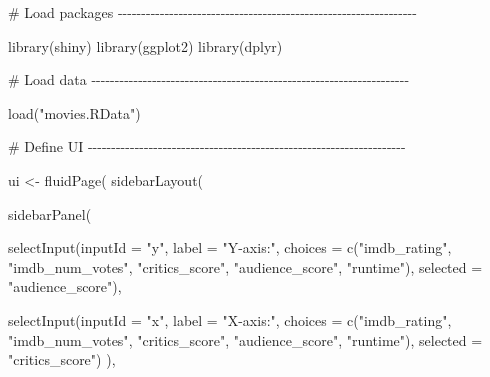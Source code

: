 \documentclass[
  letterpaper,
  DIV=11,
  numbers=noendperiod]{scrreprt}
\newenvironment{Shaded}{\begin{snugshade}}{\end{snugshade}}
\newcommand{\AttributeTok}[1]{\textcolor[rgb]{0.40,0.46,0.14}{#1}}
\newcommand{\CommentTok}[1]{\textcolor[rgb]{0.37,0.37,0.37}{#1}}
\newcommand{\FunctionTok}[1]{\textcolor[rgb]{0.28,0.35,0.67}{#1}}
\newcommand{\NormalTok}[1]{\textcolor[rgb]{0.00,0.46,0.62}{#1}}
\newcommand{\OtherTok}[1]{\textcolor[rgb]{0.00,0.46,0.62}{#1}}
\newcommand{\StringTok}[1]{\textcolor[rgb]{0.13,0.47,0.30}{#1}}
\begin{document}
\begin{Shaded}
\begin{Highlighting}[]
\CommentTok{\# Load packages {-}{-}{-}{-}{-}{-}{-}{-}{-}{-}{-}{-}{-}{-}{-}{-}{-}{-}{-}{-}{-}{-}{-}{-}{-}{-}{-}{-}{-}{-}{-}{-}{-}{-}{-}{-}{-}{-}{-}{-}{-}{-}{-}{-}{-}{-}{-}{-}{-}{-}{-}{-}{-}{-}{-}{-}{-}{-}{-}{-}{-}{-}{-}{-}}

\FunctionTok{library}\NormalTok{(shiny)}
\FunctionTok{library}\NormalTok{(ggplot2)}
\FunctionTok{library}\NormalTok{(dplyr)}

\CommentTok{\# Load data {-}{-}{-}{-}{-}{-}{-}{-}{-}{-}{-}{-}{-}{-}{-}{-}{-}{-}{-}{-}{-}{-}{-}{-}{-}{-}{-}{-}{-}{-}{-}{-}{-}{-}{-}{-}{-}{-}{-}{-}{-}{-}{-}{-}{-}{-}{-}{-}{-}{-}{-}{-}{-}{-}{-}{-}{-}{-}{-}{-}{-}{-}{-}{-}{-}{-}{-}{-}}

\FunctionTok{load}\NormalTok{(}\StringTok{"movies.RData"}\NormalTok{)}

\CommentTok{\# Define UI {-}{-}{-}{-}{-}{-}{-}{-}{-}{-}{-}{-}{-}{-}{-}{-}{-}{-}{-}{-}{-}{-}{-}{-}{-}{-}{-}{-}{-}{-}{-}{-}{-}{-}{-}{-}{-}{-}{-}{-}{-}{-}{-}{-}{-}{-}{-}{-}{-}{-}{-}{-}{-}{-}{-}{-}{-}{-}{-}{-}{-}{-}{-}{-}{-}{-}{-}{-}}

\NormalTok{ui }\OtherTok{\textless{}{-}} \FunctionTok{fluidPage}\NormalTok{(}
  \FunctionTok{sidebarLayout}\NormalTok{(}
    
    \FunctionTok{sidebarPanel}\NormalTok{(}
      
      \FunctionTok{selectInput}\NormalTok{(}\AttributeTok{inputId =} \StringTok{"y"}\NormalTok{, }
                  \AttributeTok{label =} \StringTok{"Y{-}axis:"}\NormalTok{,}
                  \AttributeTok{choices =} \FunctionTok{c}\NormalTok{(}\StringTok{"imdb\_rating"}\NormalTok{, }\StringTok{"imdb\_num\_votes"}\NormalTok{, }\StringTok{"critics\_score"}\NormalTok{, }\StringTok{"audience\_score"}\NormalTok{, }\StringTok{"runtime"}\NormalTok{), }
                  \AttributeTok{selected =} \StringTok{"audience\_score"}\NormalTok{),}
      
      \FunctionTok{selectInput}\NormalTok{(}\AttributeTok{inputId =} \StringTok{"x"}\NormalTok{, }
                  \AttributeTok{label =} \StringTok{"X{-}axis:"}\NormalTok{,}
                  \AttributeTok{choices =} \FunctionTok{c}\NormalTok{(}\StringTok{"imdb\_rating"}\NormalTok{, }\StringTok{"imdb\_num\_votes"}\NormalTok{, }\StringTok{"critics\_score"}\NormalTok{, }\StringTok{"audience\_score"}\NormalTok{, }\StringTok{"runtime"}\NormalTok{), }
                  \AttributeTok{selected =} \StringTok{"critics\_score"}\NormalTok{)}
\NormalTok{    ),}
    

\end{Highlighting}
\end{Shaded}
\end{document}
